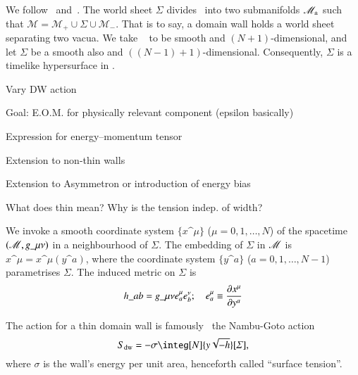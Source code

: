



\newcommand*\hypsurf{\ensuremath{\varSigma}}    %




\phpar



We follow~\citet{garrigaPerturbationsDomainWalls1991} and~\citet{ishibashiEquationMotionDomain1999}. The world sheet $\hypsurf$ divides \Manifold~into two submanifolds $\mathscr{M}_{\pm}$ such that $\mathscr{M} = \mathscr{M}_+ \cup  \hypsurf \cup \mathscr{M}_-$. That is to say, a domain wall holds a world sheet separating two vacua. We take \Manifold~ to be smooth and $(N+1)$-dimensional, and let $\hypsurf$ be a smooth also and $((N-1)+1)$-dimensional. Consequently, $\hypsurf$ is a timelike hypersurface in \Manifold. 


%


\begin{bullets}
    \item Vary DW action
    \item Goal: E.O.M. for physically relevant component (epsilon basically)
    \item Expression for energy--momentum tensor
    \item Extension to non-thin walls 
    \item Extension to Asymmetron or introduction of energy bias
    \item What does thin mean? Why is the tension indep. of width?
\end{bullets}


We invoke a smooth coordinate system $\{x\^\mu\}$ ($\mu=0,1,\dots,N$) of the spacetime $(\mathscr{M}, g\_{\mu\nu})$ in a neighbourhood of $\hypsurf$. The embedding of $\hypsurf$ in $\mathscr{M}$ is $x\^\mu = x\^\mu(y\^a)$, where the coordinate system $\{y\^a\}$ ($a=0,1,\dots,N-1$) parametrises $\hypsurf$.
The induced metric on $\hypsurf$ is
\begin{equation}\label{eq:pertwalls:thinwall:induced_metrid}
    h\_{ab} = g\_{\mu\nu} e^\mu_a e^\nu_b; \quad e^\mu_a \equiv \pdv{x\^\mu}{y\^a}%
\end{equation} 


The action for a thin domain wall is famously~\citep[e.g.][]{vachaspatiKinksDomainWalls2006} the Nambu-Goto action
\begin{equation}
    S\ped{dw} = -\sigma \integ[N]{y\sqrt{-h}}[\hypsurf],
\end{equation}
where $\sigma$ is the wall's energy per unit area, henceforth called ``surface tension''.